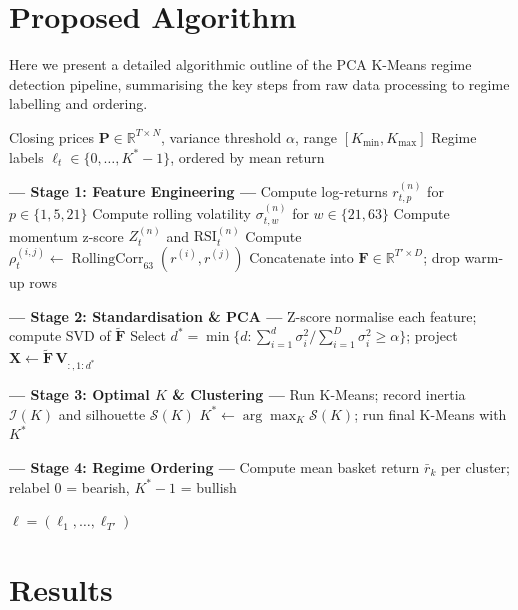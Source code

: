 \documentclass[11pt, a4paper]{article}
\begin{document}
\section{Proposed Algorithm}
Here we present a detailed algorithmic outline of the PCA K-Means regime detection pipeline, summarising the key steps from raw data processing to regime labelling and ordering.
\begin{algorithm}[H]
\caption{K-Means Regime Detection Pipeline}
\label{alg:regime_detection}
\small
\begin{algorithmic}[1]

\Require Closing prices $\mathbf{P} \in \mathbb{R}^{T \times N}$, variance threshold $\alpha$, range $[K_{\min}, K_{\max}]$
\Ensure Regime labels $\ell_t \in \{0, \dots, K^{*}\!-\!1\}$, ordered by mean return

\Statex \textbf{— Stage 1: Feature Engineering —}
    \State Compute log-returns $r_{t,p}^{(n)}$ for $p \in \{1, 5, 21\}$
    \State Compute rolling volatility $\sigma_{t,w}^{(n)}$ for $w \in \{21, 63\}$
    \State Compute momentum z-score $Z_t^{(n)}$ and $\text{RSI}_t^{(n)}$
\EndFor
{}
    \State Compute $\rho_{t}^{(i,j)} \gets \operatorname{RollingCorr}_{63}(r^{(i)}, r^{(j)})$
\EndFor
\State Concatenate into $\mathbf{F} \in \mathbb{R}^{T' \times D}$; drop warm-up rows

\Statex \textbf{— Stage 2: Standardisation \& PCA —}
\State Z-score normalise each feature; compute SVD of $\tilde{\mathbf{F}}$
\State Select $d^{*} = \min\{d : \sum_{i=1}^{d} \sigma_i^2 / \sum_{i=1}^{D} \sigma_i^2 \geq \alpha\}$; project $\mathbf{X} \gets \tilde{\mathbf{F}}\,\mathbf{V}_{:,1:d^{*}}$

\Statex \textbf{— Stage 3: Optimal $K$ \& Clustering —}
    \State Run K-Means; record inertia $\mathcal{I}(K)$ and silhouette $\mathcal{S}(K)$
\EndFor
\State $K^{*} \gets \arg\max_{K} \mathcal{S}(K)$; run final K-Means with $K^{*}$

\Statex \textbf{— Stage 4: Regime Ordering —}
\State Compute mean basket return $\bar{r}_k$ per cluster; relabel $0$ = bearish, $K^{*}\!-\!1$ = bullish

\State \Return $\boldsymbol{\ell} = (\ell_1, \dots, \ell_{T'})$
\end{algorithmic}
\end{algorithm}


\section{Results}
\end{document}
